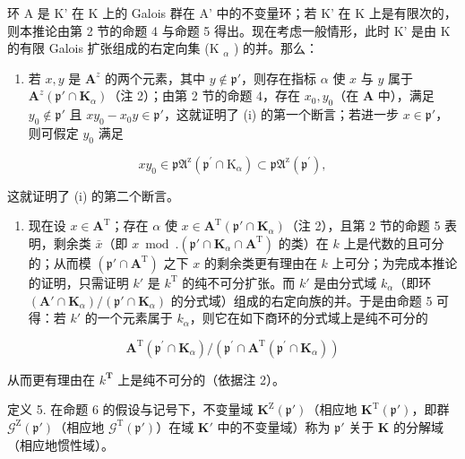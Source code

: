 环 A 是 K' 在 K 上的 Galois 群在 A' 中的不变量环；若 K' 在 K 上是有限次的，则本推论由第 2 节的命题 4 与命题 5 得出。现在考虑一般情形，此时 K' 是由 K 的有限 Galois 扩张组成的右定向集 (K \(_{\alpha}\) ) 的并。那么：

\begin{enumerate}
\def\labelenumi{(\roman{enumi})}
\tightlist
\item
  若 \(x, y\) 是 \(\mathbf{A}^z\) 的两个元素，其中 \(y \notin \mathfrak{p}'\)，则存在指标 \(\alpha\) 使 \(x\) 与 \(y\) 属于 \(\mathbf{A}^z(\mathfrak{p}' \cap \mathbf{K}_\alpha)\)（注 2）；由第 2 节的命题 4，存在 \(x_0, y_0\)（在 \(\mathbf{A}\) 中），满足 \(y_0 \notin \mathfrak{p}'\) 且 \(xy_0 - x_0y \in \mathfrak{p}'\)，这就证明了 (i) 的第一个断言；若进一步 \(x \in \mathfrak{p}'\)，则可假定 \(y_0\) 满足
\end{enumerate}

\[
x y _ {0} \in \mathfrak {p A} ^ {\mathrm{z}} (\mathfrak {p} ^ {\prime} \cap \mathrm{K} _ {\alpha}) \subset \mathfrak {p A} ^ {\mathrm{z}} (\mathfrak {p} ^ {\prime}),
\]

这就证明了 (i) 的第二个断言。

\begin{enumerate}
\def\labelenumi{(\roman{enumi})}
\setcounter{enumi}{1}
\tightlist
\item
  现在设 \(x \in \mathbf{A}^{\mathrm{T}}\)；存在 \(\alpha\) 使 \(x \in \mathbf{A}^{\mathrm{T}}(\mathfrak{p}' \cap \mathbf{K}_{\alpha})\)（注 2），且第 2 节的命题 5 表明，剩余类 \(\bar{x}\)（即 \(x \bmod. (\mathfrak{p}' \cap \mathbf{K}_{\alpha} \cap \mathbf{A}^{\mathrm{T}})\) 的类）在 \(k\) 上是代数的且可分的；从而模 \((\mathfrak{p}' \cap \mathbf{A}^{\mathrm{T}})\) 之下 \(x\) 的剩余类更有理由在 \(k\) 上可分；为完成本推论的证明，只需证明 \(k'\) 是 \(k^{\mathrm{T}}\) 的纯不可分扩张。而 \(k'\) 是由分式域 \(k_{\alpha}\)（即环 \((\mathbf{A}' \cap \mathbf{K}_{\alpha}) / (\mathfrak{p}' \cap \mathbf{K}_{\alpha})\) 的分式域）组成的右定向族的并。于是由命题 5 可得：若 \(k'\) 的一个元素属于 \(k_{\alpha}\)，则它在如下商环的分式域上是纯不可分的
\end{enumerate}

\[
\mathbf {A} ^ {\mathrm{T}} \left(\mathfrak {p} ^ {\prime} \cap \mathbf {K} _ {\alpha}\right) / \left(\mathfrak {p} ^ {\prime} \cap \mathbf {A} ^ {\mathrm{T}} \left(\mathfrak {p} ^ {\prime} \cap \mathbf {K} _ {\alpha}\right)\right)
\]

从而更有理由在 \(k^{\mathbf{T}}\) 上是纯不可分的（依据注 2）。

定义 5. 在命题 6 的假设与记号下，不变量域 \(\mathbf{K}^{\mathrm{Z}}(\mathfrak{p}')\)（相应地 \(\mathbf{K}^{\mathrm{T}}(\mathfrak{p}')\)，即群 \(\mathcal{G}^{\mathrm{Z}}(\mathfrak{p}')\)（相应地 \(\mathcal{G}^{\mathrm{T}}(\mathfrak{p}')\)）在域 \(\mathbf{K}'\) 中的不变量域）称为 \(\mathfrak{p}'\) 关于 \(\mathbf{K}\) 的分解域（相应地惯性域）。

